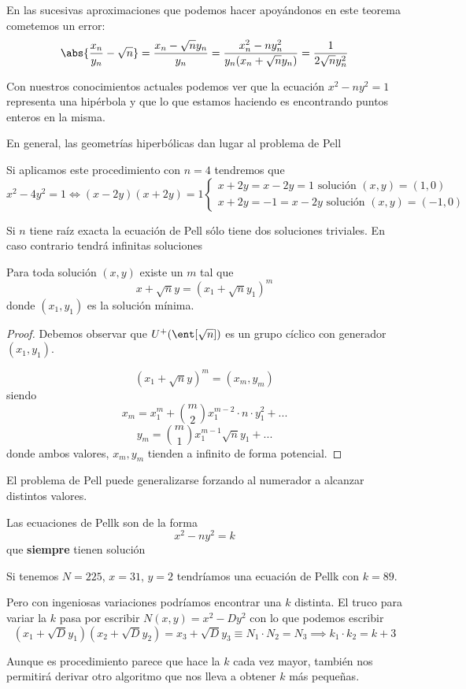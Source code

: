 \documentclass{apuntes}
\begin{document}
\obs En las sucesivas aproximaciones que podemos hacer apoyándonos en este teorema cometemos un error:
\[\abs{\frac{x_n}{y_n} - \sqrt{n}} = \frac{x_n-\sqrt{n}y_n}{y_n} = \frac{x_n^2-ny_n^2}{y_n(x_n + \sqrt{n}y_n)}=\frac{1}{2\sqrt{n}y_n^2}\]

Con nuestros conocimientos actuales podemos ver que la ecuación $x^2-ny^2 =1$ representa una hipérbola y que lo que estamos haciendo es encontrando puntos enteros en la misma.

En general, las geometrías hiperbólicas dan lugar al problema de Pell

\obs Si aplicamos este procedimiento con $n=4$ tendremos que
\[x^2-4y^2 = 1 \iff (x-2y)(x+2y) = 1 \left\{ \begin{array}{l} x+2y=x-2y = 1 \text{ solución } (x,y)=(1,0) \\ x+2y=-1=x-2y \text{ solución } (x,y)=(-1,0)\end{array}\right.\]

\begin{theorem}
Si $n$ tiene raíz exacta la ecuación de Pell sólo tiene dos soluciones triviales. En caso contrario tendrá infinitas soluciones
\end{theorem}

\begin{theorem}
Para toda solución $(x,y)$ existe un $m$ tal que
\[x+\sqrt{n}y = \left( x_1+\sqrt{n}y_1\right)^m\]
donde $(x_1,y_1)$ es la solución mínima.
\end{theorem}
\begin{proof}
Debemos observar que $U^+(\ent[\sqrt{n}])$ es un grupo cíclico con generador $(x_1,y_1)$.

\[(x_1+\sqrt{n}y)^m = (x_m,y_m)\]
siendo
\[x_m = x_1^m+ {m \choose 2 } x_1^{m-2}\cdot n \cdot y_1^2 + ...\]
\[y_m = {m \choose 1}x_1^{m-1}\sqrt{n}y_1 + ...\]
donde ambos valores, $x_m,y_m$ tienden a infinito de forma potencial.
\end{proof}

El problema de Pell puede generalizarse forzando al numerador a alcanzar distintos valores.

\begin{defn}
Las ecuaciones de Pellk son de la forma
\[x^2-ny^2 = k\]
que \textbf{siempre} tienen solución
\end{defn}

\begin{example}
Si tenemos $N=225$, $x=31$, $y=2$ tendríamos una ecuación de Pellk con $k=89$.

Pero con ingeniosas variaciones podríamos encontrar una $k$ distinta. El truco para variar la $k$ pasa por escribir $N(x,y)=x^2-Dy^2$ con lo que podemos escribir
\[(x_1+\sqrt{D}y_1)(x_2+\sqrt{D}y_2) = x_3 + \sqrt{D}y_3 \equiv N_1\cdot N_2 = N_3 \implies k_1\cdot k_2=k+3\]

Aunque es procedimiento parece que hace la $k$ cada vez mayor, también nos permitirá derivar otro algoritmo que nos lleva a obtener $k$ más pequeñas.
\end{example}
\end{document}
